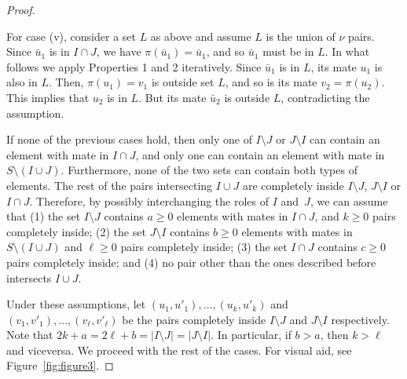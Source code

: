 \documentclass[letterpaper,11pt]{article}
\theoremstyle{definition}
\begin{document}
\begin{proof}
\begin{enumerate}
\end{enumerate}
For case (v), consider a set $L$ as above and assume $L$ is the union of $\nu$ pairs. Since $\bar{u}_1$ is in $I\cap J$, we have $\pi(\bar{u}_1)=\bar{u}_1$, and so $\bar{u}_1$ must be in $L$. In what follows we apply Properties 1 and 2 iteratively. Since $\bar{u}_1$ is in $L$, its mate $u_1$ is also in $L$. Then, $\pi(u_1)=v_1$ is outside set $L$, and so is its mate $v_2=\pi(u_2)$. This implies that $u_2$ is in $L$. But its mate $\bar{u}_2$ is outside $L$, contradicting the assumption.

If none of the previous cases hold, then only one of $I\setminus J$ or $J\setminus I$ can contain an element with mate in $I\cap J$, and  only one  can contain an element with mate in $S\setminus (I \cup J)$. Furthermore, none of the two sets can contain both types of elements. The rest of the pairs intersecting $I\cup J$ are completely inside $I\setminus J$, $J\setminus I$ or $I\cap J$. Therefore, by possibly interchanging the roles of $I$ and~$J$, we can assume that (1) the set $I\setminus J$ contains $a\geq 0$ elements with mates in $I\cap J$, and $k\geq 0$ pairs completely inside; (2) the set $J\setminus I$ contains $b\geq 0$ elements with mates in $S\setminus (I \cup J)$ and $\ell \geq 0$ pairs completely inside; (3) the set $I \cap J$ contains $c\geq 0$ pairs completely inside; and (4) no pair other than the ones described before intersects $I\cup J$.

Under these assumptions, let $(u_1,u'_1),\dots,(u_k,u'_k)$ and $(v_1,v'_1),\ldots,(v_\ell,v'_\ell)$ be the pairs completely inside $I\setminus J$ and $J\setminus I$ respectively. Note that $2k + a = 2\ell + b=|I\setminus J|=|J\setminus I|$. In particular, if $b > a$, then  $k > \ell$ and viceversa. We proceed with the rest of the cases. For visual aid, see Figure~\ref{fig:figure3}.


\end{proof}
\end{document}
